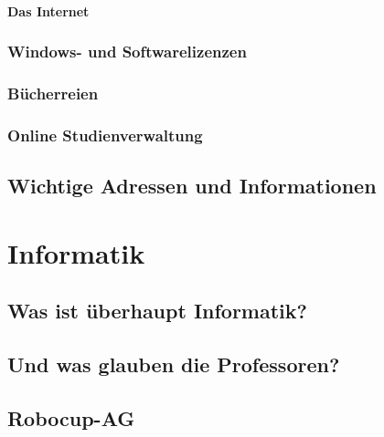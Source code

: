 \documentclass[12pt,a4paper]{scrartcl}
\begin{document}
    \paragraph{Das Internet}
    
    \subsubsection*{Windows- und Softwarelizenzen}
    
    \subsubsection*{Bücherreien}
    
	\subsubsection*{Online Studienverwaltung}
    \newpage
    \subsection{Wichtige Adressen und Informationen}
    
\newpage
\section{Informatik}
    \subsection{Was ist \"uberhaupt Informatik?}
    
    \subsection{Und was glauben die Professoren?}
    
    \newpage
	\subsection{Robocup-AG}
    
    \newpage
\end{document}
